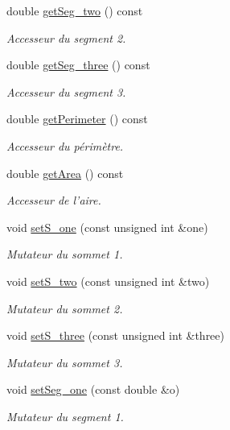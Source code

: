 \begin{DoxyCompactItemize}
double \hyperlink{class_face_a50a58b3b43a78239defee57e7202968e}{get\-Seg\-\_\-two} () const 
\begin{DoxyCompactList}\small\item\em Accesseur du segment 2. \end{DoxyCompactList}\item 
double \hyperlink{class_face_a19bb64415987240d90a1ec86d2432f05}{get\-Seg\-\_\-three} () const 
\begin{DoxyCompactList}\small\item\em Accesseur du segment 3. \end{DoxyCompactList}\item 
double \hyperlink{class_face_acd3e36c17c14b6617d92b0b9ecb2b6fc}{get\-Perimeter} () const 
\begin{DoxyCompactList}\small\item\em Accesseur du périmètre. \end{DoxyCompactList}\item 
double \hyperlink{class_face_a58beb8ce1b9f8154379db998a02ffa3d}{get\-Area} () const 
\begin{DoxyCompactList}\small\item\em Accesseur de l'aire. \end{DoxyCompactList}\item 
void \hyperlink{class_face_a96639aea98e0c24899d892bec1d5f513}{set\-S\-\_\-one} (const unsigned int \&one)
\begin{DoxyCompactList}\small\item\em Mutateur du sommet 1. \end{DoxyCompactList}\item 
void \hyperlink{class_face_a7bd40f7c3c9592fd4cc3cbd898d6fe42}{set\-S\-\_\-two} (const unsigned int \&two)
\begin{DoxyCompactList}\small\item\em Mutateur du sommet 2. \end{DoxyCompactList}\item 
void \hyperlink{class_face_aa6b474b884d3f7f54b20e5fe45c8c33f}{set\-S\-\_\-three} (const unsigned int \&three)
\begin{DoxyCompactList}\small\item\em Mutateur du sommet 3. \end{DoxyCompactList}\item 
void \hyperlink{class_face_a467b326e9be6b5aac350c9b87a5ab14c}{set\-Seg\-\_\-one} (const double \&o)
\begin{DoxyCompactList}\small\item\em Mutateur du segment 1. \end{DoxyCompactList}\item 

\end{DoxyCompactItemize}
